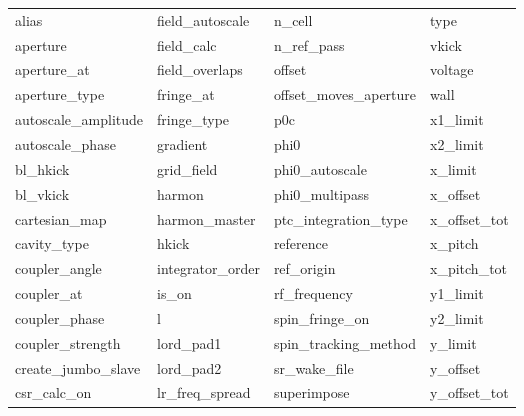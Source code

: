  \begin{tabular}{llll} \toprule
alias                       & field_autoscale             & n_cell                      & type                        \\
aperture                    & field_calc                  & n_ref_pass                  & vkick                       \\
aperture_at                 & field_overlaps              & offset                      & voltage                     \\
aperture_type               & fringe_at                   & offset_moves_aperture       & wall                        \\
autoscale_amplitude         & fringe_type                 & p0c                         & x1_limit                    \\
autoscale_phase             & gradient                    & phi0                        & x2_limit                    \\
bl_hkick                    & grid_field                  & phi0_autoscale              & x_limit                     \\
bl_vkick                    & harmon                      & phi0_multipass              & x_offset                    \\
cartesian_map               & harmon_master               & ptc_integration_type        & x_offset_tot                \\
cavity_type                 & hkick                       & reference                   & x_pitch                     \\
coupler_angle               & integrator_order            & ref_origin                  & x_pitch_tot                 \\
coupler_at                  & is_on                       & rf_frequency                & y1_limit                    \\
coupler_phase               & l                           & spin_fringe_on              & y2_limit                    \\
coupler_strength            & lord_pad1                   & spin_tracking_method        & y_limit                     \\
create_jumbo_slave          & lord_pad2                   & sr_wake_file                & y_offset                    \\
csr_calc_on                 & lr_freq_spread              & superimpose                 & y_offset_tot                \\

\end{tabular}
